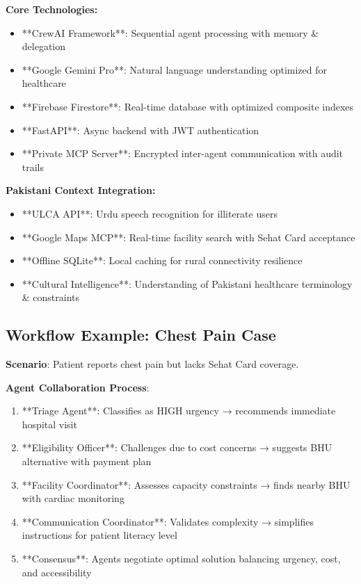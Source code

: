 \documentclass[11pt,a4paper]{article}
\begin{document}
\textbf{Core Technologies:}
\begin{itemize}[leftmargin=*, itemsep=0pt]
    \item **CrewAI Framework**: Sequential agent processing with memory \& delegation
    \item **Google Gemini Pro**: Natural language understanding optimized for healthcare
    \item **Firebase Firestore**: Real-time database with optimized composite indexes
    \item **FastAPI**: Async backend with JWT authentication
    \item **Private MCP Server**: Encrypted inter-agent communication with audit trails
\end{itemize}

\textbf{Pakistani Context Integration:}
\begin{itemize}[leftmargin=*, itemsep=0pt]
    \item **ULCA API**: Urdu speech recognition for illiterate users
    \item **Google Maps MCP**: Real-time facility search with Sehat Card acceptance
    \item **Offline SQLite**: Local caching for rural connectivity resilience
    \item **Cultural Intelligence**: Understanding of Pakistani healthcare terminology \& constraints
\end{itemize}

\subsection{Workflow Example: Chest Pain Case}

\textbf{Scenario}: Patient reports chest pain but lacks Sehat Card coverage.

\textbf{Agent Collaboration Process}:
\begin{enumerate}[itemsep=0pt]
    \item **Triage Agent**: Classifies as HIGH urgency → recommends immediate hospital visit
    \item **Eligibility Officer**: Challenges due to cost concerns → suggests BHU alternative with payment plan
    \item **Facility Coordinator**: Assesses capacity constraints → finds nearby BHU with cardiac monitoring
    \item **Communication Coordinator**: Validates complexity → simplifies instructions for patient literacy level
    \item **Consensus**: Agents negotiate optimal solution balancing urgency, cost, and accessibility
\end{enumerate}
\end{document}
